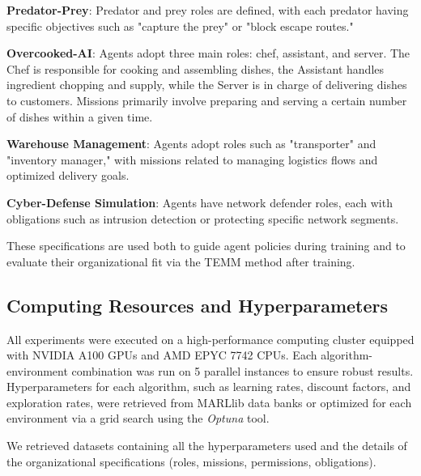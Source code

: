 \documentclass[sigconf,anonymous]{aamas}
\begin{document}
\begin{enumerate*}[label={\roman*)}, itemjoin={; \quad}]
    \item \textbf{Predator-Prey}: Predator and prey roles are defined, with each predator having specific objectives such as "capture the prey" or "block escape routes."
    

    \item \textbf{Overcooked-AI}: Agents adopt three main roles: chef, assistant, and server. The Chef is responsible for cooking and assembling dishes, the Assistant handles ingredient chopping and supply, while the Server is in charge of delivering dishes to customers. Missions primarily involve preparing and serving a certain number of dishes within a given time.
    
    \item \textbf{Warehouse Management}: Agents adopt roles such as "transporter" and "inventory manager," with missions related to managing logistics flows and optimized delivery goals.
    
    \item \textbf{Cyber-Defense Simulation}: Agents have network defender roles, each with obligations such as intrusion detection or protecting specific network segments.
\end{enumerate*}

These specifications are used both to guide agent policies during training and to evaluate their organizational fit via the TEMM method after training.

\subsection{Computing Resources and Hyperparameters}

All experiments were executed on a high-performance computing cluster equipped with NVIDIA A100 GPUs and AMD EPYC 7742 CPUs. Each algorithm-environment combination was run on 5 parallel instances to ensure robust results. Hyperparameters for each algorithm, such as learning rates, discount factors, and exploration rates, were retrieved from MARLlib data banks or optimized for each environment via a grid search using the \textit{Optuna} tool.

We retrieved datasets containing all the hyperparameters used and the details of the organizational specifications (roles, missions, permissions, obligations). %
\end{document}
